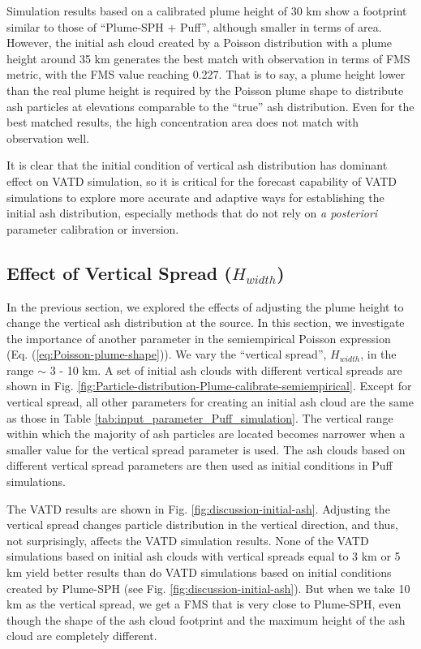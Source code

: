 \documentclass[utf8]{frontiersSCNS} %
\begin{document}
Simulation results based on a calibrated plume height of 30 km show a footprint similar to those of ``Plume-SPH + Puff'', although smaller in terms of area. However, the initial ash cloud created by a Poisson distribution with a plume height around 35 km generates the best match with observation in terms of FMS metric, with the FMS value reaching 0.227.  That is to say, a plume height lower than the real plume height is required by the Poisson plume shape to distribute ash particles at elevations comparable to the ``true'' ash distribution. Even for the best matched results, the high concentration area does not match with observation well.

It is clear that the initial condition of vertical ash distribution has dominant effect on VATD simulation, so it is critical for the forecast capability of VATD simulations to explore more accurate and adaptive ways for establishing the initial ash distribution, especially methods that do not rely on \textit{a posteriori} parameter calibration or inversion.

\subsection{Effect of Vertical Spread ($H_{width}$)}
In the previous section, we explored the effects of adjusting the plume height to change the vertical ash distribution at the source. In this section, we investigate the importance of another parameter in the semiempirical Poisson expression (Eq. (\ref{eq:Poisson-plume-shape})). We vary the ``vertical spread'', $H_{width}$, in the range $\sim$ 3 - 10 km. A set of initial ash clouds  with different vertical spreads are shown in Fig. \ref{fig:Particle-distribution-Plume-calibrate-semiempirical}. Except for vertical spread, all other parameters for creating an initial ash cloud are the same as those in Table \ref{tab:input_parameter_Puff_simulation}. The vertical range within which the majority of ash particles are located becomes narrower when a smaller value for the vertical spread parameter is used. The ash clouds based on different vertical spread parameters are then used as initial conditions in Puff simulations.

The VATD results are shown in Fig. \ref{fig:discussion-initial-ash}. Adjusting the vertical spread changes particle distribution in the vertical direction, and thus, not surprisingly, affects the VATD simulation results. None of the VATD simulations based on initial ash clouds with vertical spreads equal to 3 km or 5 km yield better results than do VATD simulations based on initial conditions created by Plume-SPH (see Fig. \ref{fig:discussion-initial-ash}). But when we take 10 km as the vertical spread, we get a FMS that is very close to Plume-SPH, even though the shape of the ash cloud footprint and the maximum height of the ash cloud are completely different.
\end{document}
